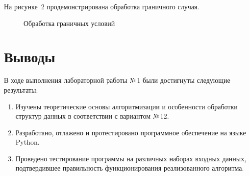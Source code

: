 \documentclass[14pt,a4paper]{extarticle}
\begin{document}
На рисунке~2 продемонстрирована обработка граничного случая.

\begin{figure}[H]
  \centering
  \caption{Обработка граничных условий}
  \label{fig:screen2}
\end{figure}

\clearpage
\section{Выводы}
В ходе выполнения лабораторной работы №\,1 были достигнуты следующие результаты:
\begin{enumerate}
  \item Изучены теоретические основы алгоритмизации и особенности обработки структур данных в соответствии с вариантом №\,12.
  \item Разработано, отлажено и протестировано программное обеспечение на языке Python.
  \item Проведено тестирование программы на различных наборах входных данных, подтвердившее правильность функционирования реализованного алгоритма.
\end{enumerate}
\end{document}
